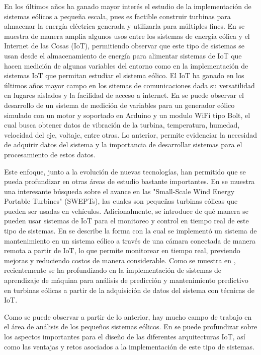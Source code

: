 \documentclass[letterpaper,12pt, oneside]{book}
\begin{document}
En los últimos años ha ganado mayor interés el estudio de la implementación de sistemas eólicos a pequeña escala, pues es factible construir turbinas para almacenar la energía eléctrica generada y utilizarla para múltiples fines. En \cite{ref4} se muestra de manera amplia algunos usos entre los sistemas de energía eólica y el Internet de las Cosas (IoT), permitiendo observar que este tipo de sistemas se usan desde el almacenamiento de energía para alimentar sistemas de IoT que hacen medición de algunas variables del entorno como en la implementación de sistemas IoT que permitan estudiar el sistema eólico. El IoT ha ganado en los últimos años mayor campo en los sitemas de comunicaciones dada su versatilidad en lugares aislados y la facilidad de acceso a internet. En \cite{ref5} se puede observar el desarrollo de un sistema de medición de variables para un generador eólico simulado con un motor y soportado en Arduino y un modulo WiFi tipo Bolt, el cual busca obtener datos de vibración de la turbina, temperatura, humedad, velocidad del eje, voltaje, entre otras. Lo anterior, permite evidenciar la necesidad de adquirir datos del sistema y la importancia de desarrollar sistemas para el procesamiento de estos datos. 

Este enfoque, junto a la evolución de nuevas tecnologías, han permitido que se pueda profundizar en otras áreas de estudio bastante importantes. En \cite{ref6} se muestra una interesante búsqueda sobre el avance en las "Small-Scale Wind Energy Portable Turbines" (SWEPTs), las cuales son pequeñas turbinas eólicas que pueden ser usadas en vehículos. Adicionalmente, se introduce de qué manera se pueden usar sistemas de IoT para el monitoreo y control en tiempo real de este tipo de sistemas.  En \cite{ref7} se describe la forma con la cual se implementó un sistema de mantenimiento en un sistema eólico a través de una cámara conectada de manera remota a partir de IoT, lo que permite monitorear en tiempo real, previendo mejoras y reduciendo costos de manera considerable. Como se muestra en \cite{ref8}, recientemente se ha profundizado en la implementación de sistemas de aprendizaje de máquina para análisis de predicción y mantenimiento predictivo en turbinas eólicas a partir de la adquisición de datos del sistema con técnicas de IoT. 

Como se puede observar a partir de lo anterior, hay mucho campo de trabajo en el área de análisis de los pequeños sistemas eólicos. En \cite{ref9} se puede profundizar sobre los aspectos importantes para el diseño de las diferentes arquitecturas IoT, así como las ventajas y retos asociados a la implementación de este tipo de sistemas. 
\end{document}

